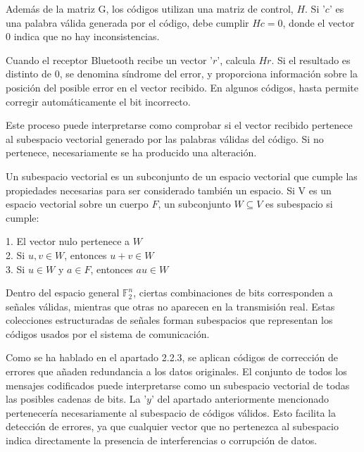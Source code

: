 \documentclass[letterpaper,12pt]{article}
\begin{document}
Además de la matriz G, los códigos utilizan una matriz de control, $H$. Si '$c$' es una palabra válida
generada por el código, debe cumplir $Hc=0$, donde el vector 0 indica que no hay
inconsistencias.

Cuando el receptor Bluetooth recibe un vector '$r$', calcula $Hr$. Si el resultado es distinto de 0, se
denomina síndrome del error, y proporciona información sobre la posición del posible error en el
vector recibido. En algunos códigos, hasta permite corregir automáticamente el bit incorrecto.

Este proceso puede interpretarse como comprobar si el vector recibido pertenece al subespacio
vectorial generado por las palabras válidas del código. Si no pertenece, necesariamente se ha
producido una alteración.





\newpage
{}

Un subespacio vectorial es un subconjunto de un espacio vectorial que cumple las propiedades
necesarias para ser considerado también un espacio. Si V es un espacio vectorial sobre un cuerpo
$F$, un subconjunto $W\subseteq V$ es subespacio si cumple:

   1. El vector nulo pertenece a $W$\\
   2. Si $u,v\in W$, entonces $u+v\in W$\\
   3. Si $u\in W$ y $a\in F$, entonces $au\in W$

Dentro del espacio general $\mathbb{F}_2^n$, ciertas combinaciones de bits corresponden a señales válidas,
mientras que otras no aparecen en la transmisión real. Estas colecciones estructuradas de señales
forman subespacios que representan los códigos usados por el sistema de comunicación.

Como se ha hablado en el apartado 2.2.3, se aplican códigos de corrección de errores que añaden
redundancia a los datos originales. El conjunto de todos los mensajes codificados puede
interpretarse como un subespacio vectorial de todas las posibles cadenas de bits. La '$y$' del
apartado anteriormente mencionado pertenecería necesariamente al subespacio de códigos válidos.
Esto facilita la detección de errores, ya que cualquier vector que no pertenezca al subespacio indica
directamente la presencia de interferencias o corrupción de datos.
\end{document}

